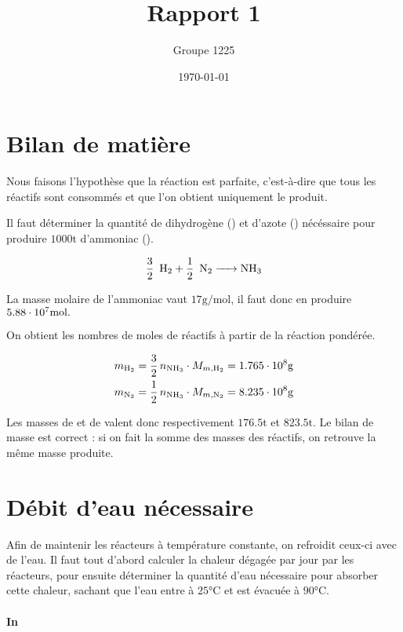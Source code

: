 \documentclass[a4paper, oneside, 12pt]{article}
\title{Rapport 1}
\author{Groupe 1225}
\date{\today}
\begin{document}
\maketitle

\section{Bilan de matière}

Nous faisons l'hypothèse que la réaction est parfaite, 
c'est-à-dire que tous les réactifs sont consommés 
et que l'on obtient uniquement le produit.

Il faut déterminer la quantité de dihydrogène () et d'azote () 
nécéssaire pour produire $1000 \si{\tonne}$ d'ammoniac ().

\begin{equation}
	\ce{\frac{3}{2} \, H2 + \frac{1}{2} \, N2 -> NH3} 
	\label{eq:ammoniac}
\end{equation}

La masse molaire de l'ammoniac vaut $17 \si{\gram\per\mole}$,
il faut donc en produire $5.88\cdot 10^{7} \si{\mole}.$

On obtient les nombres de moles de réactifs à partir de la réaction pondérée. 

\begin{align*}
	m_{\ce{H2}}  = \frac{3}{2} \, n_{\ce{NH3}} \cdot M_{m, \ce{H2}} 
	= 1.765\e{8} \si{\gram} \\
	m_{\ce{N2}} = \frac{1}{2} \, n_{\ce{NH3}} \cdot M_{m, \ce{N2}} 
	= 8.235\e{8} \si{\gram}
\end{align*}

Les masses de  et de  valent donc 
respectivement $176.5 \si{\tonne}$ et $823.5 \si{\tonne}$.
Le bilan de masse est correct : si on fait la somme des masses des réactifs,
on retrouve la même masse produite.


\section{Débit d'eau nécessaire}

Afin de maintenir les réacteurs à température constante, 
on refroidit ceux-ci avec de l'eau.
Il faut tout d'abord calculer la chaleur dégagée par jour par les réacteurs,
pour ensuite déterminer la quantité d'eau nécessaire pour absorber cette chaleur,
sachant que l'eau entre à $25 \si{\degreeCelsius}$ et 
est évacuée à $90 \si{\degreeCelsius}$. 

\paragraph{In}
\end{document}
